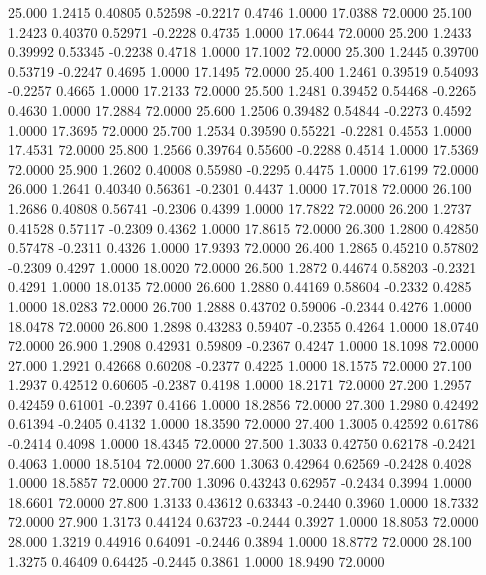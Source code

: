  25.000   1.2415   0.40805   0.52598  -0.2217   0.4746   1.0000  17.0388  72.0000
  25.100   1.2423   0.40370   0.52971  -0.2228   0.4735   1.0000  17.0644  72.0000
  25.200   1.2433   0.39992   0.53345  -0.2238   0.4718   1.0000  17.1002  72.0000
  25.300   1.2445   0.39700   0.53719  -0.2247   0.4695   1.0000  17.1495  72.0000
  25.400   1.2461   0.39519   0.54093  -0.2257   0.4665   1.0000  17.2133  72.0000
  25.500   1.2481   0.39452   0.54468  -0.2265   0.4630   1.0000  17.2884  72.0000
  25.600   1.2506   0.39482   0.54844  -0.2273   0.4592   1.0000  17.3695  72.0000
  25.700   1.2534   0.39590   0.55221  -0.2281   0.4553   1.0000  17.4531  72.0000
  25.800   1.2566   0.39764   0.55600  -0.2288   0.4514   1.0000  17.5369  72.0000
  25.900   1.2602   0.40008   0.55980  -0.2295   0.4475   1.0000  17.6199  72.0000
  26.000   1.2641   0.40340   0.56361  -0.2301   0.4437   1.0000  17.7018  72.0000
  26.100   1.2686   0.40808   0.56741  -0.2306   0.4399   1.0000  17.7822  72.0000
  26.200   1.2737   0.41528   0.57117  -0.2309   0.4362   1.0000  17.8615  72.0000
  26.300   1.2800   0.42850   0.57478  -0.2311   0.4326   1.0000  17.9393  72.0000
  26.400   1.2865   0.45210   0.57802  -0.2309   0.4297   1.0000  18.0020  72.0000
  26.500   1.2872   0.44674   0.58203  -0.2321   0.4291   1.0000  18.0135  72.0000
  26.600   1.2880   0.44169   0.58604  -0.2332   0.4285   1.0000  18.0283  72.0000
  26.700   1.2888   0.43702   0.59006  -0.2344   0.4276   1.0000  18.0478  72.0000
  26.800   1.2898   0.43283   0.59407  -0.2355   0.4264   1.0000  18.0740  72.0000
  26.900   1.2908   0.42931   0.59809  -0.2367   0.4247   1.0000  18.1098  72.0000
  27.000   1.2921   0.42668   0.60208  -0.2377   0.4225   1.0000  18.1575  72.0000
  27.100   1.2937   0.42512   0.60605  -0.2387   0.4198   1.0000  18.2171  72.0000
  27.200   1.2957   0.42459   0.61001  -0.2397   0.4166   1.0000  18.2856  72.0000
  27.300   1.2980   0.42492   0.61394  -0.2405   0.4132   1.0000  18.3590  72.0000
  27.400   1.3005   0.42592   0.61786  -0.2414   0.4098   1.0000  18.4345  72.0000
  27.500   1.3033   0.42750   0.62178  -0.2421   0.4063   1.0000  18.5104  72.0000
  27.600   1.3063   0.42964   0.62569  -0.2428   0.4028   1.0000  18.5857  72.0000
  27.700   1.3096   0.43243   0.62957  -0.2434   0.3994   1.0000  18.6601  72.0000
  27.800   1.3133   0.43612   0.63343  -0.2440   0.3960   1.0000  18.7332  72.0000
  27.900   1.3173   0.44124   0.63723  -0.2444   0.3927   1.0000  18.8053  72.0000
  28.000   1.3219   0.44916   0.64091  -0.2446   0.3894   1.0000  18.8772  72.0000
  28.100   1.3275   0.46409   0.64425  -0.2445   0.3861   1.0000  18.9490  72.0000
